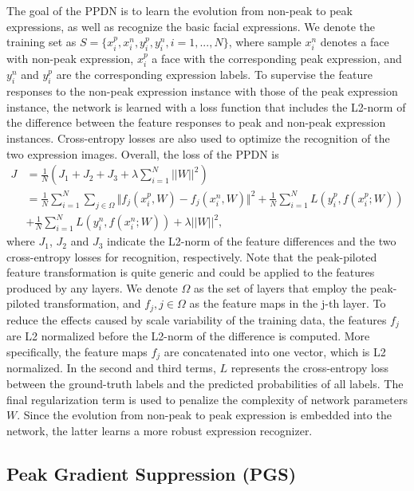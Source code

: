 \documentclass[runningheads]{llncs}
\begin{document}
The goal of the PPDN is to learn the evolution from non-peak 
to peak expressions, as well as recognize the basic facial expressions. 
We denote the training set as 
$S =  \lbrace x^{p}_{i},x^n_{i},y^p_{i},y^n_i,i = 1,...,N \rbrace$, where 
sample $x^n_{i}$ denotes a face with non-peak expression, $x^p_{i}$ a
face with the corresponding peak expression, and $y^n_{i}$ and $y^p_{i}$ are 
the corresponding expression labels. To supervise the feature responses
to the non-peak expression instance with those of the peak expression instance, 
the network is learned with a loss function that includes the L2-norm 
of the difference between the feature responses to peak and non-peak 
expression instances. Cross-entropy losses are also used to optimize the 
recognition of the two expression images. Overall, the loss of the PPDN is
\begin{equation}\begin{aligned} J &= \frac{1}{N}(J_1 + J_2 +J_3 + \lambda \sum_{i=1}^N||W||^2) \\
& = \frac{1}{N}\sum_{i=1}^N \sum_{j \in \Omega}\Vert f_j(x^p_{i},W) - f_j(x^n_{i},W) \Vert^2  +  \frac{1}{N}\sum_{i=1}^N L(y^p_i,f(x^p_i;W)) \\
&+ \frac{1}{N}\sum_{i=1}^N L(y^n_i,f(x^n_i;W))+ \lambda||W||^2,
\end{aligned}
\label{eq:loss}
 \end{equation}
where $J_1$, $J_2$ and $J_3$ indicate the L2-norm of the feature differences 
and the two cross-entropy losses for recognition, respectively. Note that the 
peak-piloted feature transformation is quite generic and could be applied to 
the features produced by any layers. We denote $\Omega$ as the set of layers 
that employ the peak-piloted transformation, and $f_j, j \in \Omega$ as the 
feature maps in the j-th layer. To reduce the effects caused by scale 
variability of the training data, the features $f_j$  are L2 normalized
before the L2-norm of the difference is computed. More specifically, the 
feature maps $f_j$ are concatenated into one vector, which is L2 normalized. 
In the second and third terms, $L$ represents the cross-entropy loss 
between the ground-truth labels and the predicted probabilities of all 
labels. The final regularization term is used to penalize the complexity of 
network parameters $W$. Since the evolution from non-peak to 
peak expression is embedded into the network, the latter learns a more 
robust expression recognizer. 
 
\subsection{Peak Gradient Suppression (PGS)}
\end{document}
